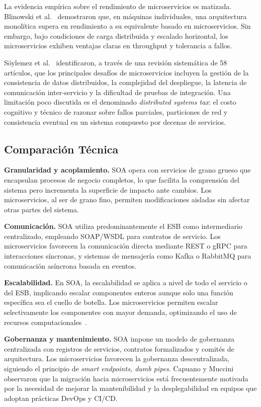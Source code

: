 \documentclass[10pt,twocolumn,letterpaper]{article}
\begin{document}
La evidencia empírica sobre el rendimiento de microservicios es matizada. Blinowski et al.~\cite{b1} demostraron que, en máquinas individuales, una arquitectura monolítica supera en rendimiento a su equivalente basado en microservicios. Sin embargo, bajo condiciones de carga distribuida y escalado horizontal, los microservicios exhiben ventajas claras en throughput y tolerancia a fallos.

Söylemez et al.~\cite{b3} identificaron, a través de una revisión sistemática de 58 artículos, que los principales desafíos de microservicios incluyen la gestión de la consistencia de datos distribuidos, la complejidad del despliegue, la latencia de comunicación inter-servicio y la dificultad de pruebas de integración. Una limitación poco discutida es el denominado \textit{distributed systems tax}: el costo cognitivo y técnico de razonar sobre fallos parciales, particiones de red y consistencia eventual en un sistema compuesto por decenas de servicios.

\subsection{Comparación Técnica}

\textbf{Granularidad y acoplamiento.} SOA opera con servicios de grano grueso que encapsulan procesos de negocio completos, lo que facilita la comprensión del sistema pero incrementa la superficie de impacto ante cambios. Los microservicios, al ser de grano fino, permiten modificaciones aisladas sin afectar otras partes del sistema.

\textbf{Comunicación.} SOA utiliza predominantemente el ESB como intermediario centralizado, empleando SOAP/WSDL para contratos de servicio. Los microservicios favorecen la comunicación directa mediante REST o gRPC para interacciones síncronas, y sistemas de mensajería como Kafka o RabbitMQ para comunicación asíncrona basada en eventos.

\textbf{Escalabilidad.} En SOA, la escalabilidad se aplica a nivel de todo el servicio o del ESB, implicando escalar componentes enteros aunque solo una función específica sea el cuello de botella. Los microservicios permiten escalar selectivamente los componentes con mayor demanda, optimizando el uso de recursos computacionales~\cite{b1}.

\textbf{Gobernanza y mantenimiento.} SOA impone un modelo de gobernanza centralizada con registros de servicios, contratos formalizados y comités de arquitectura. Los microservicios favorecen la gobernanza descentralizada, siguiendo el principio de \textit{smart endpoints, dumb pipes}. Capuano y Muccini~\cite{b2} observaron que la migración hacia microservicios está frecuentemente motivada por la necesidad de mejorar la mantenibilidad y la desplegabilidad en equipos que adoptan prácticas DevOps y CI/CD.
\end{document}

